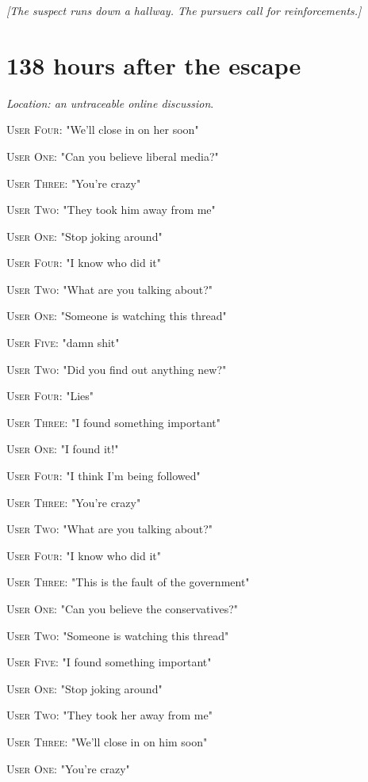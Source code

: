 \documentclass{report}
\begin{document}
\textit{[The suspect runs down a hallway. The pursuers call for reinforcements.]}


\section*{138 \small{hours after the escape}}

\textit{Location: an untraceable online discussion}. 

\textsc{User Four}: "We'll close in on her soon" 

\textsc{User One}: "Can you believe liberal media?" 

\textsc{User Three}: "You're crazy" 

\textsc{User Two}: "They took him away from me" 

\textsc{User One}: "Stop joking around" 

\textsc{User Four}: "I know who did it" 

\textsc{User Two}: "What are you talking about?" 

\textsc{User One}: "Someone is watching this thread" 

\textsc{User Five}: "damn shit" 

\textsc{User Two}: "Did you find out anything new?" 

\textsc{User Four}: "Lies" 

\textsc{User Three}: "I found something important" 

\textsc{User One}: "I found it!" 

\textsc{User Four}: "I think I'm being followed" 

\textsc{User Three}: "You're crazy" 

\textsc{User Two}: "What are you talking about?" 

\textsc{User Four}: "I know who did it" 

\textsc{User Three}: "This is the fault of the government" 

\textsc{User One}: "Can you believe the conservatives?" 

\textsc{User Two}: "Someone is watching this thread" 

\textsc{User Five}: "I found something important" 

\textsc{User One}: "Stop joking around" 

\textsc{User Two}: "They took her away from me" 

\textsc{User Three}: "We'll close in on him soon" 

\textsc{User One}: "You're crazy" 
\end{document}
